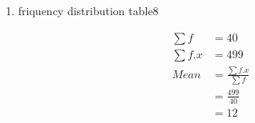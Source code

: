 \renewcommand{\theequation}{\theenumi}
\begin{enumerate}[label=\arabic*.,ref=\thesubsection.\theenumi]
\item \begin{table}[!ht]
	\centering
	
	\caption{friquency distribution table8 }
\end{table}
\begin{align}
\sum{f} &= 40
\\
\sum{f.x} &= 499
\\
Mean &= \frac{\sum{f.x}}{\sum{f}}
\\ &= \frac{499}{40}
\\&= 12
\end{align}
\end{enumerate}